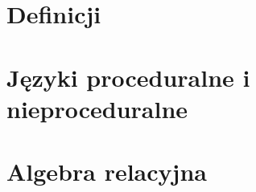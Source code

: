 
\section{Definicji}


\section{Języki proceduralne i nieproceduralne}


\section{Algebra relacyjna}
